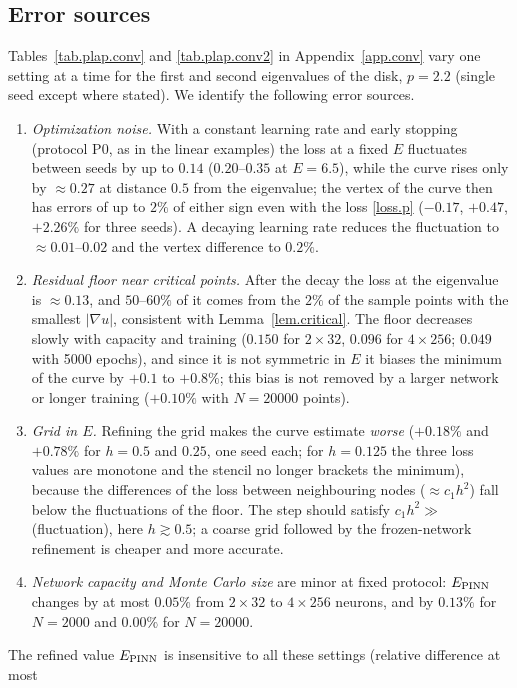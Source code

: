 \documentclass[10pt]{amsart}
\newenvironment{revblock}{\color{blue}}{}
\theoremstyle{definition}
\theoremstyle{remark}
\theoremstyle{plain}
\begin{document}
\begin{revblock}
\subsection{Error sources}
Tables~\ref{tab.plap.conv} and \ref{tab.plap.conv2} in Appendix~\ref{app.conv} vary one setting at a
time for the first and second eigenvalues of the disk, $p=2.2$ (single seed except where stated). We identify the following error
sources.
\begin{enumerate}
\item \emph{Optimization noise.} With a constant learning rate and early stopping (protocol P0, as in
the linear examples) the loss at a fixed $E$ fluctuates between seeds by up to $0.14$ ($0.20$--$0.35$ at $E=6.5$), while the
curve rises only by $\approx0.27$ at distance $0.5$ from the eigenvalue; the vertex of the curve then
has errors of up to $2\%$ of either sign even with the loss \eqref{loss.p} ($-0.17$, $+0.47$, $+2.26\%$
for three seeds). A decaying learning rate reduces the
fluctuation to $\approx0.01$--$0.02$ and the vertex difference to $0.2\%$.
\item \emph{Residual floor near critical points.} After the decay the loss at the eigenvalue is
$\approx0.13$, and $50$--$60\%$ of it comes from the $2\%$ of the sample points with the smallest
$|\nabla u|$, consistent with Lemma~\ref{lem.critical}. The floor decreases slowly with capacity and
training ($0.150$ for $2\times32$, $0.096$ for $4\times256$; $0.049$ with 5000 epochs), and since it
is not symmetric in $E$ it biases the minimum of the curve by $+0.1$ to $+0.8\%$; this bias is not
removed by a larger network or longer training ($+0.10\%$ with $N=20000$ points).
\item \emph{Grid in $E$.} Refining the grid makes the curve estimate \emph{worse}
($+0.18\%$ and $+0.78\%$ for $h=0.5$ and $0.25$, one seed each; for $h=0.125$ the three loss values
are monotone and the stencil no longer brackets the minimum), because the differences of the loss
between neighbouring nodes ($\approx c_1h^2$) fall below the fluctuations of the floor. The step should
satisfy $c_1h^2\gg$ (fluctuation), here $h\gtrsim0.5$; a coarse grid followed by the frozen-network
refinement is cheaper and more accurate.
\item \emph{Network capacity and Monte Carlo size} are minor at fixed protocol: $E_{\rm PINN}$ changes
by at most $0.05\%$ from $2\times32$ to $4\times256$ neurons, and by $0.13\%$ for $N=2000$ and $0.00\%$
for $N=20000$.
\end{enumerate}
The refined value $E_{\rm PINN}$ is insensitive to all these settings (relative difference at most

\end{revblock}
\end{document}
